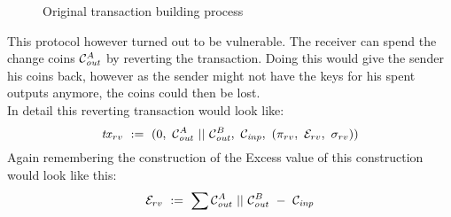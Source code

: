 \begin{figure}
    \label{fig:txOriginal}
    \centering
    \caption{Original transaction building process}
\end{figure}
This protocol however turned out to be vulnerable. The receiver can spend the change coins $\mathcal{C}_{\mathit{out}}^A$ by reverting the transaction. Doing this would give the sender his coins back, however as the sender
might not have the keys for his spent outputs anymore, the coins could then be lost.\\
In detail this reverting transaction would look like:
\[ \mathit{tx}_{rv} ~:=~ (0 ,~ \mathcal{C}_{\mathit{out}}^A ~||~ \mathcal{C}_{\mathit{out}}^B ,~ \mathcal{C}_{\mathit{inp}} ,~ (\pi_{rv} ,~ \mathcal{E}_{rv} ,~ \sigma_{rv}) ) \]
Again remembering the construction of the Excess value of this construction would look like this:
\[ \mathcal{E}_{rv} ~:=~ \sum{\mathcal{C}_{\mathit{out}}^A ~||~\mathcal{C}_{\mathit{out}}^B ~-~\mathcal{C}_{\mathit{inp}}} \]
